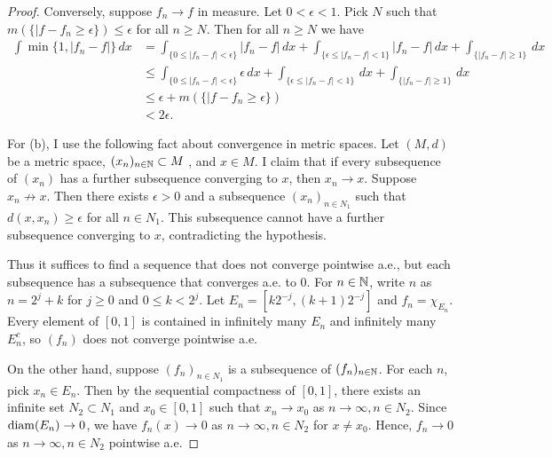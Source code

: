 \documentclass{article}
\begin{document}
\begin{proof}
Conversely, suppose $f_n \to f$ in measure.  Let $0 < \epsilon < 1$. Pick $N$ such that $m( \{ |f - f_n \ge \epsilon \})  \le \epsilon$ for all $n \ge N$.  Then for all $n \ge N$ we have
\begin{align*}
\int \min \{1, |f_n - f|\} \, dx & =  \int_{\{ 0 \le |f_n - f| < \epsilon \}} |f_n - f| \, dx + \int_{\{ \epsilon \le |f_n - f| < 1\}} |f_n - f| \, dx + \int_{\{|f_n - f| \ge 1\}} \, dx
\\ & \le \int_{\{ 0 \le |f_n - f| < \epsilon \}} \epsilon \, dx + \int_{\{ \epsilon \le |f_n - f| < 1\}} \, dx + \int_{\{|f_n - f| \ge 1\}} \, dx
\\ & \le \epsilon + m( \{ |f - f_n \ge \epsilon \})
\\ & < 2 \epsilon.
\end{align*}

For (b), I use the following fact about convergence in metric spaces. Let $(M, d)$ be a metric space, $(x_n)_{n \in \mathbb{N}} \subset M$ , and $x \in M$.  I claim that if every subsequence of $(x_n)$ has a further subsequence converging to $x$, then $x_n \to x$.  Suppose $x_n \not \to x$.  Then there exists $\epsilon > 0$ and a subsequence $(x_n)_{n \in N_1}$ such that $d(x, x_n) \ge \epsilon$ for all $n \in N_1$. This subsequence cannot have a further subsequence converging to $x$, contradicting the hypothesis.

Thus it suffices to find a sequence that does not converge pointwise a.e., but each subsequence has a subsequence that converges a.e. to $0$.  For $n \in \mathbb{N}$, write $n$ as $n = 2^j + k$ for $j \ge 0$ and $0 \le k < 2^j$.  Let $E_n = [k 2^{-j}, (k+1) 2^{-j}]$ and $f_n = \chi_{E_n}$.  Every element of $[0,1]$ is contained in infinitely many $E_n$ and infinitely many $E_n^c$, so $(f_n)$ does not converge pointwise a.e.  

On the other hand, suppose $(f_n)_{n \in N_1}$ is a subsequence of $(f_n)_{n \in \mathbb{N}}$.  For each $n$, pick $x_n \in E_n$.  Then by the sequential compactness of $[0,1]$, there exists an infinite set $N_2 \subset N_1$ and $x_0 \in [0,1]$ such that $x_n \to x_0$ as $n \to \infty, n \in N_2$. Since $\mathrm{diam}(E_n) \to 0$, we have $f_n(x) \to 0$ as $n \to \infty, n \in N_2$ for $x \neq x_0$.  Hence, $f_n \to 0$ as $n \to \infty, n \in N_2$ pointwise a.e.
\end{proof}
\end{document}
